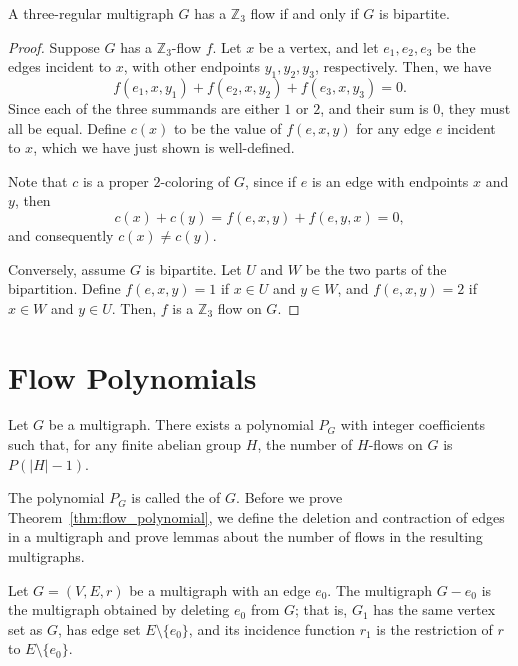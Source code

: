 \begin{proposition}
	A three-regular multigraph \(G\) has a \(\mathbb{Z}_3\) flow if and only if \(G\) is bipartite.
\end{proposition}

\begin{proof}
	Suppose \(G\) has a \(\mathbb{Z}_3\)-flow \(f\).
	Let \(x\) be a vertex, and let \(e_1, e_2, e_3\) be the edges incident to \(x\), with other endpoints \(y_1, y_2, y_3\), respectively.
	Then, we have
	\begin{equation}
		f(e_1, x, y_1) + f(e_2, x, y_2) + f(e_3, x, y_3) = 0.
	\end{equation}
	Since each of the three summands are either \(1\) or \(2\), and their sum is \(0\), they must all be equal.
	Define \(c(x)\) to be the value of \(f(e, x, y)\) for any edge \(e\) incident to \(x\), which we have just shown is well-defined.

	Note that \(c\) is a proper \(2\)-coloring of \(G\), since if \(e\) is an edge with endpoints \(x\) and \(y\), then
	\begin{equation}
		c(x) + c(y) = f(e, x, y) + f(e, y, x) = 0,
	\end{equation}
	and consequently \(c(x) \neq c(y)\).

	Conversely, assume \(G\) is bipartite.
	Let \(U\) and \(W\) be the two parts of the bipartition.
	Define \(f(e, x, y) = 1\) if \(x \in U\) and \(y \in W\),
	and \(f(e, x, y) = 2\) if \(x \in W\) and \(y \in U\).
	Then, \(f\) is a \(\mathbb{Z}_3\) flow on \(G\).
\end{proof}

\section{Flow Polynomials}

\begin{theorem} \label{thm:flow_polynomial}
	Let \(G\) be a multigraph.
	There exists a polynomial \(P_G\)
	with integer coefficients such that,
	for any finite abelian group \(H\),
	the number of \(H\)-flows on \(G\) is \(P(|H| - 1)\).
\end{theorem}

The polynomial \(P_G\) is called the  of \(G\).
Before we prove Theorem~\ref{thm:flow_polynomial}, we define the deletion and contraction of edges in a multigraph and prove lemmas about the number of flows in the resulting multigraphs.

\begin{definition}[Deletion]
	Let \(G = (V, E, r)\) be a multigraph with an edge \(e_0\).
	The multigraph \(G - e_0\) is the multigraph obtained by deleting \(e_0\) from \(G\);
	that is,
	\(G_1\) has the same vertex set as \(G\),
	has edge set \(E \setminus \{e_0\}\),
	and its incidence function \(r_1\) is the restriction of \(r\) to \(E \setminus \{e_0\}\).
\end{definition}

